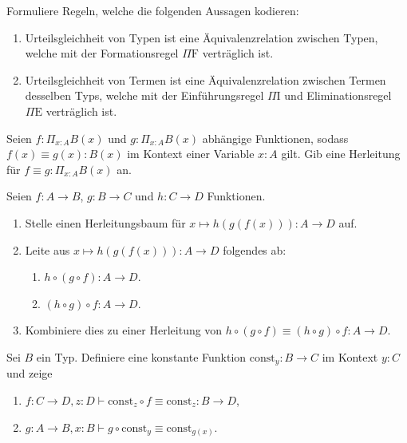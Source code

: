 \documentclass{uebung}
\begin{document}

\begin{exercise}
  Formuliere Regeln, welche die folgenden Aussagen kodieren:
  \begin{enumerate}
    \item Urteilsgleichheit von Typen ist eine Äquivalenzrelation zwischen Typen, welche mit der Formationsregel $\Pi\mathrm{F}$ verträglich ist.
    \item Urteilsgleichheit von Termen ist eine Äquivalenzrelation zwischen Termen desselben Typs, welche mit der Einführungsregel $\Pi\mathrm{I}$ und Eliminationsregel $\Pi\mathrm{E}$ verträglich ist.
  \end{enumerate}
\end{exercise}

\begin{exercise}
  Seien $f:\Pi_{x:A}B(x)$ und $g:\Pi_{x:A}B(x)$ abhängige Funktionen, sodass $f(x)\equiv g(x):B(x)$ im Kontext einer Variable $x:A$ gilt.
  Gib eine Herleitung für $f\equiv g:\Pi_{x:A}B(x)$ an.
\end{exercise}

\begin{exercise}
  Seien $f:A\to B$, $g:B\to C$ und $h:C\to D$ Funktionen.
  \begin{enumerate}
    \item Stelle einen Herleitungsbaum für $x\mapsto h(g(f(x))):A\to D$ auf.
    \item Leite aus $x\mapsto h(g(f(x))):A\to D$ folgendes ab:
      \begin{enumerate}
        \item $h\circ (g\circ f):A\to D$.
        \item $(h\circ g)\circ f:A\to D$.
      \end{enumerate}
    \item Kombiniere dies zu einer Herleitung von $h\circ(g\circ f)\equiv (h\circ g)\circ f:A\to D$.
  \end{enumerate}
\end{exercise}

\begin{exercise}
  Sei $B$ ein Typ.
  Definiere eine konstante Funktion $\mathrm{const}_y:B\to C$ im Kontext $y:C$ und zeige
  \begin{enumerate}
    \item $f:C\to D,z:D\vdash\mathrm{const}_z\circ f \equiv \mathrm{const}_z:B\to D$,
    \item $g:A\to B, x:B\vdash g\circ\mathrm{const}_y \equiv \mathrm{const}_{g(x)}$.
  \end{enumerate}
\end{exercise}
\end{document}

